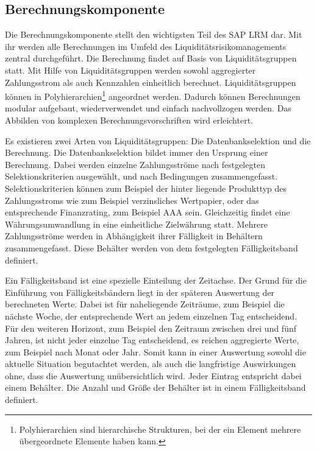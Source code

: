 \begin{onehalfspacing}
\subsection{Berechnungskomponente}
\label{sec:berechnungskomponente}
Die Berechnungskomponente stellt den wichtigsten Teil des SAP LRM dar. Mit ihr werden alle Berechnungen im Umfeld des Liquiditätsrisikomanagements zentral durchgeführt. Die Berechnung findet auf Basis von Liquiditätsgruppen statt. Mit Hilfe von Liquiditätsgruppen werden sowohl aggregierter Zahlungsstrom als auch Kennzahlen einheitlich berechnet. Liquiditätsgruppen können in Polyhierarchien\footnote{Polyhierarchien sind hierarchische Strukturen, bei der ein Element mehrere übergeordnete Elemente haben kann.} angeordnet werden. Dadurch können Berechnungen modular aufgebaut, wiederverwendet und einfach nachvollzogen werden. Das Abbilden von komplexen Berechnungsvorschriften wird erleichtert.


Es existieren zwei Arten von Liquiditätsgruppen: Die Datenbankselektion und die Berechnung. Die Datenbankselektion bildet immer den Ursprung einer Berechnung. Dabei werden einzelne Zahlungsströme nach festgelegten Selektionskriterien ausgewählt, und nach Bedingungen zusammengefasst. Selektionskriterien können zum Beispiel der hinter liegende Produkttyp des Zahlungsstroms wie zum Beispiel verzinsliches Wertpapier, oder das entsprechende Finanzrating, zum Beispiel AAA sein. Gleichzeitig findet eine Währungsumwandlung in eine einheitliche Zielwährung statt. Mehrere Zahlungsströme werden in Abhängigkeit ihrer Fälligkeit in Behältern zusammengefasst. Diese Behälter werden von dem festgelegten Fälligkeitsband definiert.

Ein Fälligkeitsband ist eine spezielle Einteilung der Zeitachse. Der Grund für die Einführung von Fälligkeitsbändern liegt in der späteren Auswertung der berechneten Werte. Dabei ist für naheliegende Zeiträume, zum Beispiel die nächste Woche, der entsprechende Wert an jedem einzelnen Tag entscheidend. Für den weiteren Horizont, zum Beispiel den Zeitraum zwischen drei und fünf Jahren, ist nicht jeder einzelne Tag  entscheidend, es reichen aggregierte Werte, zum Beispiel nach Monat oder Jahr. Somit kann in einer Auswertung sowohl die aktuelle Situation begutachtet werden, als auch die langfristige Auswirkungen ohne, dass die Auswertung unübersichtlich wird. Jeder Eintrag entspricht dabei einem Behälter. Die Anzahl und Größe der Behälter ist in einem Fälligkeitsband definiert.


\end{onehalfspacing}
